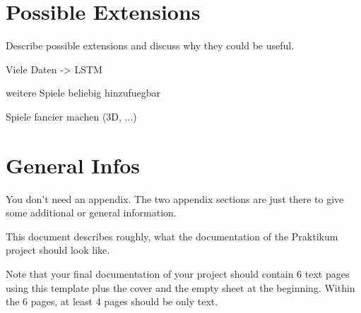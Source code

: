 \documentclass{utue} %
\begin{document}
\section{Possible Extensions}

Describe possible extensions and discuss why they could be useful.

Viele Daten -> LSTM

weitere Spiele beliebig hinzufuegbar

Spiele fancier machen (3D, ...)


\appendix

\section{General Infos}

You don't need an appendix. The two appendix sections are just there to give some additional or general information.

This document describes roughly, what the documentation of the Praktikum project should look like.

Note that your final documentation of your project should contain 6 text pages using this template plus the cover and the empty sheet at the beginning. Within the 6 pages, at least 4 pages should be only text.




\end{document}
